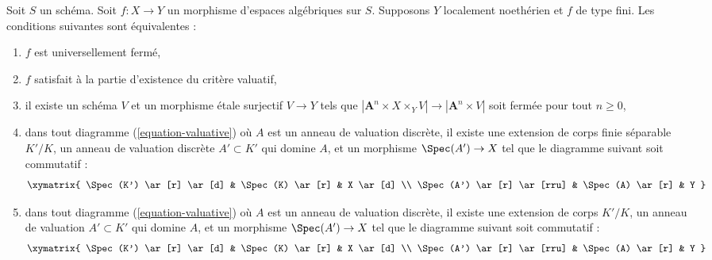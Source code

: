 \begin{lemma}
\label{lemma-check-universally-closed-Noetherian}
Soit $S$ un schéma. Soit $f : X \to Y$ un morphisme d'espaces algébriques
sur $S$. Supposons $Y$ localement noethérien et $f$
de type fini. Les conditions suivantes sont équivalentes :
\begin{enumerate}
\item $f$ est universellement fermé,
\item $f$ satisfait à la partie d'existence du critère valuatif,
\item il existe un schéma $V$ et un morphisme \'etale surjectif
$V \to Y$ tels que
$|\mathbf{A}^n \times X \times_Y V| \to |\mathbf{A}^n \times V|$ soit fermée
pour tout $n \geq 0$,
\item dans tout diagramme (\ref{equation-valuative}) où $A$ est un anneau de
valuation discrète, il existe une extension de corps finie séparable $K'/K$,
un anneau de valuation discrète $A' \subset K'$ qui domine $A$, et
un morphisme $\Spec(A') \to X$ tel que le diagramme suivant soit commutatif :
$$
\xymatrix{
\Spec(K') \ar[r] \ar[d] & \Spec(K) \ar[r] & X \ar[d] \\
\Spec(A') \ar[r] \ar[rru] & \Spec(A) \ar[r] & Y
}
$$
\item dans tout diagramme (\ref{equation-valuative}) où $A$ est un anneau de
valuation discrète, il existe une extension de corps $K'/K$,
un anneau de valuation $A' \subset K'$ qui domine $A$, et
un morphisme $\Spec(A') \to X$ tel que le diagramme suivant soit commutatif :
$$
\xymatrix{
\Spec(K') \ar[r] \ar[d] & \Spec(K) \ar[r] & X \ar[d] \\
\Spec(A') \ar[r] \ar[rru] & \Spec(A) \ar[r] & Y
}
$$
\end{enumerate}
\end{lemma}

